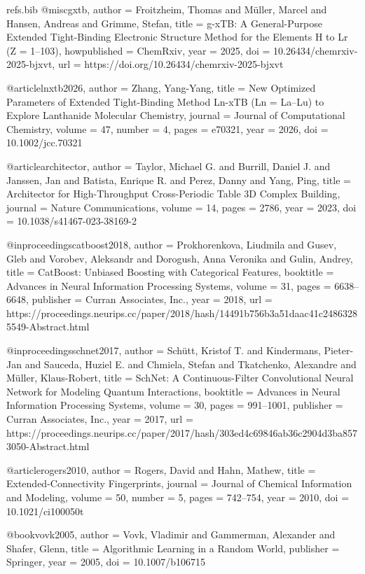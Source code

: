 \begin{filecontents}[overwrite]{refs.bib}
@misc{gxtb,
  author       = {Froitzheim, Thomas and M{\"u}ller, Marcel and
                  Hansen, Andreas and Grimme, Stefan},
  title        = {{g-xTB}: A General-Purpose Extended Tight-Binding
                  Electronic Structure Method for the Elements
                  {H} to {Lr} ({Z} = 1--103)},
  howpublished = {ChemRxiv},
  year         = {2025},
  doi          = {10.26434/chemrxiv-2025-bjxvt},
  url          = {https://doi.org/10.26434/chemrxiv-2025-bjxvt}
}

@article{lnxtb2026,
  author  = {Zhang, Yang-Yang},
  title   = {New Optimized Parameters of Extended Tight-Binding Method
             {Ln-xTB} ({Ln} = {La}--{Lu}) to Explore
             Lanthanide Molecular Chemistry},
  journal = {Journal of Computational Chemistry},
  volume  = {47},
  number  = {4},
  pages   = {e70321},
  year    = {2026},
  doi     = {10.1002/jcc.70321}
}

@article{architector,
  author  = {Taylor, Michael G. and Burrill, Daniel J. and Janssen, Jan and
             Batista, Enrique R. and Perez, Danny and Yang, Ping},
  title   = {Architector for High-Throughput Cross-Periodic Table
             {3D} Complex Building},
  journal = {Nature Communications},
  volume  = {14},
  pages   = {2786},
  year    = {2023},
  doi     = {10.1038/s41467-023-38169-2}
}

@inproceedings{catboost2018,
  author    = {Prokhorenkova, Liudmila and Gusev, Gleb and
               Vorobev, Aleksandr and Dorogush, Anna Veronika and
               Gulin, Andrey},
  title     = {{CatBoost}: Unbiased Boosting with Categorical Features},
  booktitle = {Advances in Neural Information Processing Systems},
  volume    = {31},
  pages     = {6638--6648},
  publisher = {Curran Associates, Inc.},
  year      = {2018},
  url       = {https://proceedings.neurips.cc/paper/2018/hash/14491b756b3a51daac41c24863285549-Abstract.html}
}

@inproceedings{schnet2017,
  author    = {Sch{\"u}tt, Kristof T. and Kindermans, Pieter-Jan and
               Sauceda, Huziel E. and Chmiela, Stefan and
               Tkatchenko, Alexandre and M{\"u}ller, Klaus-Robert},
  title     = {{SchNet}: A Continuous-Filter Convolutional Neural Network
               for Modeling Quantum Interactions},
  booktitle = {Advances in Neural Information Processing Systems},
  volume    = {30},
  pages     = {991--1001},
  publisher = {Curran Associates, Inc.},
  year      = {2017},
  url       = {https://proceedings.neurips.cc/paper/2017/hash/303ed4c69846ab36c2904d3ba8573050-Abstract.html}
}

@article{rogers2010,
  author  = {Rogers, David and Hahn, Mathew},
  title   = {Extended-Connectivity Fingerprints},
  journal = {Journal of Chemical Information and Modeling},
  volume  = {50},
  number  = {5},
  pages   = {742--754},
  year    = {2010},
  doi     = {10.1021/ci100050t}
}

@book{vovk2005,
  author    = {Vovk, Vladimir and Gammerman, Alexander and Shafer, Glenn},
  title     = {Algorithmic Learning in a Random World},
  publisher = {Springer},
  year      = {2005},
  doi       = {10.1007/b106715}
}

\end{filecontents}

